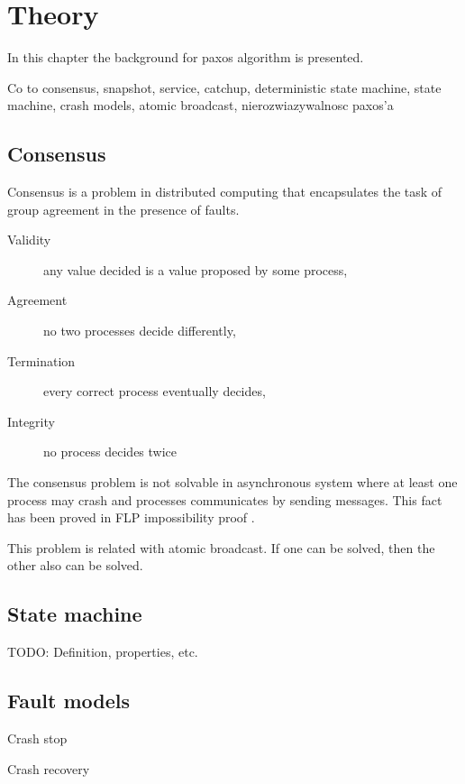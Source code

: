 \chapter{Theory}

%

In this chapter the background for paxos algorithm is presented.

Co to consensus, snapshot, service, catchup, deterministic state machine, state machine, 
crash models, atomic broadcast, nierozwiazywalnosc paxos'a

\section{Consensus}

Consensus is a problem in distributed computing that encapsulates the task of group agreement in the presence of faults.

\begin{description}
    \item[Validity] any value decided is a value proposed by some process,
    \item[Agreement] no two processes decide differently,
    \item[Termination] every correct process eventually decides,
    \item[Integrity] no process decides twice
\end{description}

The consensus problem is not solvable in asynchronous system where at least one process may crash and processes communicates by sending messages. This fact has been proved in FLP impossibility proof \cite{FLP}. 

This problem is related with atomic broadcast. If one can be solved, then the other also can be solved.

\section{State machine}

TODO: Definition, properties, etc.

\section{Fault models}

Crash stop

Crash recovery
